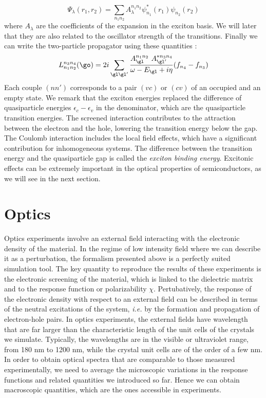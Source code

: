 \begin{equation}
	\Psi_\lambda(r_1, r_2) = \sum_{n_1 n_2} A_\lambda^{n_1n_2} \psi_{n_1}^* (r_1) \psi_{n_2} (r_2)
\end{equation}
where $A_\lambda$ are the coefficients of the expansion in the exciton basis. We will later that they are also related to the oscillator strength of the transitions. Finally we can write the two-particle propagator using these quantities :
\begin{equation}
	L^{n_3n_4}_{n_1n_2}(\go) = 2i \sum_{\gl\gl'}\frac{A^{n_1n_2}_\gl \ A^{*n_3n_4}_{\gl'}}{\omega - E_\gl + i\eta} (f_{n_4} - f_{n_3})
\end{equation}
Each couple $(nn')$ corresponds to a pair $(vc)$ or $(cv)$ of an occupied and an empty state. We remark that the exciton energies replaced the difference of quasiparticle energies $\epsilon_c - \epsilon_v$ in the denominator, which are the quasiparticle transition energies. The screened interaction contributes to the attraction between the electron and the hole, lowering the transition energy below the gap. The Coulomb interaction includes the local field effects, which have a significant contribution for inhomogeneous systems. The difference between the transition energy and the quasiparticle gap is called the \textit{exciton binding energy}. Excitonic effects can be extremely important in the optical properties of semiconductors, as we will see in the next section.
%

%
\section{Optics}
Optics experiments involve an external field interacting with the electronic density of the material. In the regime of low intensity field where we can describe it as a perturbation, the formalism presented above is a perfectly suited simulation tool. The key quantity to reproduce the results of these experiments is the electronic screening of the material, which is linked to the dielectric matrix and to the response function or polarizability $\chi$. Pertubatively, the response of the electronic density with respect to an external field can be described in terms of the neutral excitations of the system, \textit{i.e.} by the formation and propagation of electron-hole pairs.
In optics experiments, the external fields have wavelength that are far larger than the characteristic length of the unit cells of the crystals we simulate. Typically, the wavelengths are in the visible or ultraviolet range, from 180 nm to 1200 nm, while the crystal unit cells are of the order of a few nm. 
In order to obtain optical spectra that are comparable to those measured experimentally, we need to average the microscopic variations in the response functions and related quantities we introduced so far. Hence we can obtain macroscopic quantities, which are the ones accessible in experiments. 

